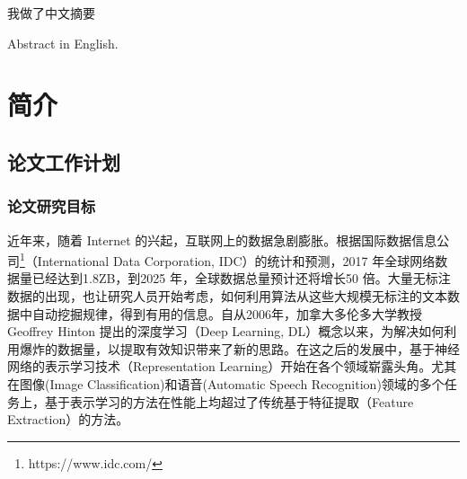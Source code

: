 \documentclass[master,openright,twoside,color]{buaathesis}
\begin{document}



\maketitle
\pagestyle{frontmatter}
\begin{cabstract}
我做了中文摘要
\end{cabstract}

\begin{eabstract}
Abstract  in English.
\end{eabstract}
\tableofcontents
\listoffigures
\listoftables
%

\mainmatter
\pagestyle{mainmatter}

\chapter{简介}
\section{论文工作计划}
\subsection{论文研究目标}
近年来，随着 Internet 的兴起，互联网上的数据急剧膨胀。根据国际数据信息公司\footnote{https://www.idc.com/}（International Data Corporation, IDC）的统计和预测，2017 年全球网络数据量已经达到1.8ZB，到2025 年，全球数据总量预计还将增长50 倍。大量无标注数据的出现，也让研究人员开始考虑，如何利用算法从这些大规模无标注的文本数据中自动挖掘规律，得到有用的信息。自从2006年，加拿大多伦多大学教授 Geoffrey Hinton 提出的深度学习（Deep Learning, DL）概念以来\cite{hinton2006reducing}，为解决如何利用爆炸的数据量，以提取有效知识带来了新的思路。在这之后的发展中，基于神经网络的表示学习技术（Representation Learning）开始在各个领域崭露头角。尤其在图像(Image Classification)和语音(Automatic Speech Recognition)领域的多个任务上，基于表示学习的方法在性能上均超过了传统基于特征提取（Feature Extraction）的方法。
\end{document}
